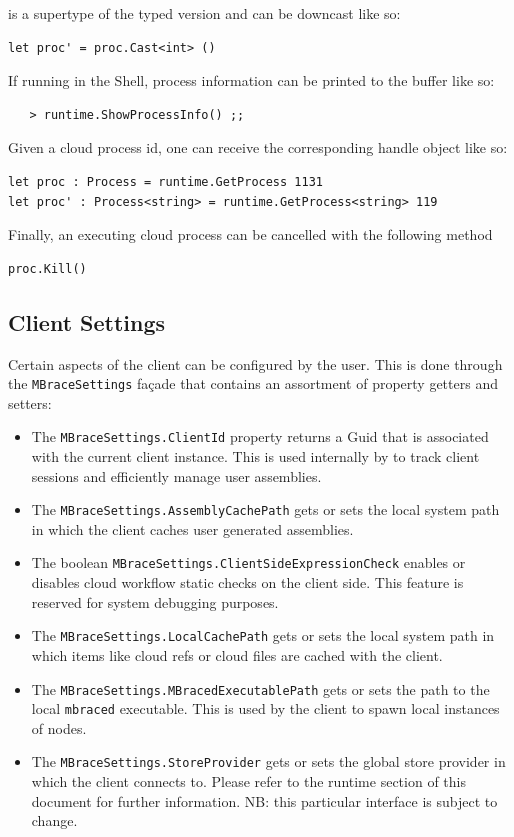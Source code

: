 is a supertype of the typed version and can be downcast like so:
\begin{lstlisting}
let proc' = proc.Cast<int> ()
\end{lstlisting}
If running in the \mbrace{} Shell, process information can be printed to the buffer like so:
\begin{verbatim}
   > runtime.ShowProcessInfo() ;;
\end{verbatim}
Given a cloud process id, one can receive the corresponding handle object like so:
\begin{lstlisting}
let proc : Process = runtime.GetProcess 1131
let proc' : Process<string> = runtime.GetProcess<string> 119
\end{lstlisting}
Finally, an executing cloud process can be cancelled with the following method
\begin{lstlisting}
proc.Kill()
\end{lstlisting}

\subsection{\TitularMbrace{} Client Settings}

Certain aspects of the \mbrace{} client can be configured by the user.
This is done through the \texttt{MBraceSettings} fa\c{c}ade that contains an
assortment of property getters and setters:
\begin{itemize}
\item The \texttt{MBraceSettings.ClientId} property returns a Guid that is
associated with the current client instance. This is used internally by \mbrace{} to
track client sessions and efficiently manage user assemblies.
\item The \texttt{MBraceSettings.AssemblyCachePath} gets or sets the local system 
path in which the client caches user generated assemblies.
\item The boolean \texttt{MBraceSettings.ClientSideExpressionCheck} enables or 
disables cloud workflow static checks on the client side. This feature is reserved
for system debugging purposes.
\item The \texttt{MBraceSettings.LocalCachePath} gets or sets the local system path
in which items like cloud refs or cloud files are cached with the client.
\item The \texttt{MBraceSettings.MBracedExecutablePath} gets or sets the path to the
local \texttt{mbraced} executable. This is used by the client to spawn local instances
of \mbrace{} nodes.
\item The \texttt{MBraceSettings.StoreProvider} gets or sets the global store provider
in which the client connects to. Please refer to the runtime section of this document
for further information. NB: this particular interface is subject to change.
\end{itemize}
